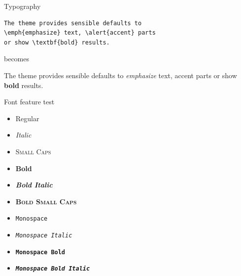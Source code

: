 \documentclass[10pt,spanish]{beamer}
\begin{document}
\begin{frame}[fragile]{Typography}
\begin{verbatim}The theme provides sensible defaults to
\emph{emphasize} text, \alert{accent} parts
or show \textbf{bold} results.\end{verbatim}

\begin{center}becomes\end{center}

The theme provides sensible defaults to \emph{emphasize} text,
\alert{accent} parts or show \textbf{bold} results.
\end{frame}

\begin{frame}{Font feature test}
\begin{itemize}
\item Regular
\item \textit{Italic}
\item \textsc{Small Caps}
\item \textbf{Bold}
\item \textbf{\textit{Bold Italic}}
\item \textbf{\textsc{Bold Small Caps}}
\item \texttt{Monospace}
\item \texttt{\textit{Monospace Italic}}
\item \texttt{\textbf{Monospace Bold}}
\item \texttt{\textbf{\textit{Monospace Bold Italic}}}
\end{itemize}
\end{frame}
\end{document}
